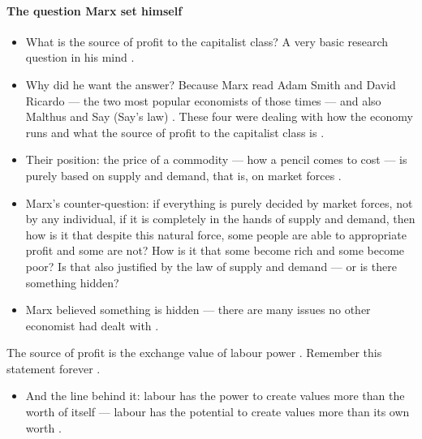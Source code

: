 \paragraph{The question Marx set himself}
\begin{itemize}
    \item What is the source of profit to the capitalist class? A very basic research question in his mind .
    \item Why did he want the answer? Because Marx read Adam Smith and David Ricardo --- the two most popular economists of those times --- and also Malthus and Say (Say's law) . These four were dealing with how the economy runs and what the source of profit to the capitalist class is .
    \item Their position: the price of a commodity --- how a pencil comes to cost  --- is purely based on supply and demand, that is, on market forces .
    \item Marx's counter-question: if everything is purely decided by market forces, not by any individual, if it is completely in the hands of supply and demand, then how is it that despite this natural force, some people are able to appropriate profit and some are not?  How is it that some become rich and some become poor?  Is that also justified by the law of supply and demand --- or is there something hidden? 
    \item Marx believed something is hidden --- there are many issues no other economist had dealt with .
\end{itemize}

\begin{KeyConcept}
The source of profit is the exchange value of labour power . Remember this statement forever .
\begin{itemize}
    \item And the line behind it: labour has the power to create values more than the worth of itself --- labour has the potential to create values more than its own worth .
\end{itemize}
\end{KeyConcept}

